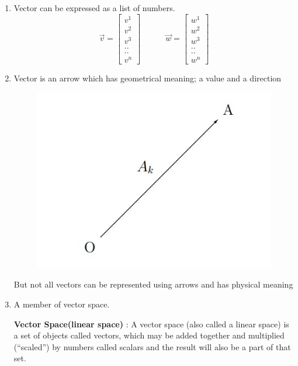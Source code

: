 \documentclass{article}
\begin{document}
	\begin{enumerate}
		\item Vector can be expressed as a list of numbers.
		$$\overrightarrow{v} = \begin{bmatrix}
			v^{1}\\
			v^{2}\\
			v^{3}\\
			..\\
			..\\
			v^{n}
		\end{bmatrix} \quad\quad\quad \overrightarrow{w} = \begin{bmatrix}
		w^{1}\\
		w^{2}\\
		w^{3}\\
		..\\
		..\\
		w^{n}
	\end{bmatrix}$$
	
		\item Vector is an arrow which has geometrical meaning; a value and a direction
		\begin{figure}[hbp]
			\begin{center}
				\includegraphics[scale=0.45]{3.jpg}
				\label{f3}
			\end{center}
		\end{figure}
		
		But not all vectors can be represented using arrows and has physical meaning
		
		\item A member of vector space.
			
		\textbf{Vector Space(linear space)} : A vector space (also called a linear space) is a set of objects called vectors,
		which may be added together and multiplied (“scaled”) by numbers called scalars and the result will also
		be a part of that set.
	\end{enumerate}
\end{document}
